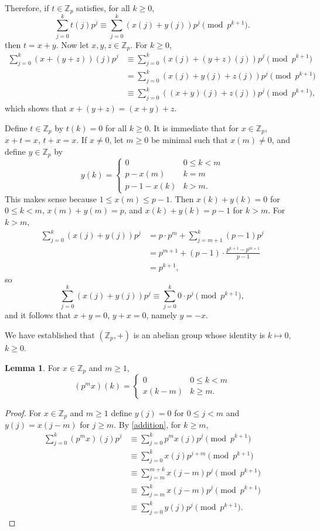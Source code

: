 \documentclass{article}
\theoremstyle{definition}
\newtheorem{lemma}[theorem]{Lemma}
\theoremstyle{definition}
\begin{document}
Therefore, if $t \in \mathbb{Z}_p$ satisfies, for all $k \geq 0$,
\[
\sum_{j=0}^k t(j) p^j \equiv \sum_{j=0}^k (x(j)+y(j)) p^j \pmod{p^{k+1}}.
\]
then $t=x+y$.
Now let $x,y,z \in \mathbb{Z}_p$. For $k \geq 0$,
\begin{align*}
\sum_{j=0}^k (x+(y+z))(j) p^j &\equiv \sum_{j=0}^k (x(j)+(y+z)(j)) p^j \pmod{p^{k+1}}\\
&=\sum_{j=0}^k (x(j)+y(j)+z(j)) p^j \pmod{p^{k+1}}\\
&\equiv \sum_{j=0}^k ((x+y)(j)+z(j)) p^j \pmod{p^{k+1}},
\end{align*}
which shows that $x+(y+z) = (x+y)+z$. 

Define $t \in \mathbb{Z}_p$ by $t(k)=0$ for all $k \geq 0$. It is immediate that for
$x \in \mathbb{Z}_p$, $x+t=x$, $t+x=x$. 
If $x \neq 0$, let $m \geq 0$ be minimal such that $x(m) \neq 0$, and define
$y \in \mathbb{Z}_p$ by
\[
y(k) =\begin{cases}
0&0 \leq k < m\\
p-x(m)&k=m\\
p-1-x(k)&k >m.
\end{cases}
\]
This makes sense because $1 \leq x(m) \leq p-1$. Then
$x(k)+y(k) =0$ for $0 \leq k < m$, $x(m)+y(m) = p$, and $x(k)+y(k)=p-1$ for $k>m$. For
$k > m$,
\begin{align*}
\sum_{j=0}^k (x(j)+y(j))p^j & = p\cdot p^m + \sum_{j=m+1}^k (p-1)p^j\\
&=p^{m+1} + (p-1) \cdot \frac{p^{k+1}-p^{m+1}}{p-1}\\
&=p^{k+1},
\end{align*}
so 
\[
\sum_{j=0}^k (x(j)+y(j))p^j \equiv \sum_{j=0}^k 0 \cdot p^j \pmod{p^{k+1}},
\]
and it follows that $x+y=0$, $y+x=0$, namely $y=-x$.

We have established that $(\mathbb{Z}_p,+)$ is an abelian group whose identity is 
 $k \mapsto 0$, $k \geq 0$.
 
\begin{lemma}
For $x \in \mathbb{Z}_p$ and $m \geq 1$, 
\[
(p^m x)(k) = \begin{cases}
0&0 \leq k < m\\
x(k-m)&k \geq m.
\end{cases}
\]
\label{timesp}
\end{lemma}
\begin{proof}
For $x \in \mathbb{Z}_p$ and $m \geq 1$ define 
$y(j)=0$ for $0 \leq j <m$ and 
$y(j) = x(j-m)$ for $j \geq m$.
By \eqref{addition}, for $k \geq m$,
\begin{align*}
\sum_{j=0}^k (p^mx)(j) p^j&\equiv \sum_{j=0}^k p^m x(j) p^j \pmod{p^{k+1}}\\
&\equiv \sum_{j=0}^k x(j)p^{j+m} \pmod{p^{k+1}}\\
&\equiv \sum_{j=m}^{m+k} x(j-m) p^j \pmod{p^{k+1}}\\
&\equiv \sum_{j=m}^k x(j-m) p^j \pmod{p^{k+1}}\\
&\equiv \sum_{j=0}^k y(j) p^j \pmod{p^{k+1}}.
\end{align*}
\end{proof}
\end{document}
